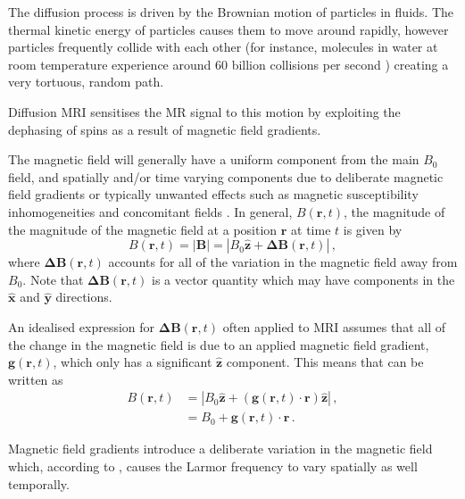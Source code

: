 The diffusion process is driven by the Brownian motion of particles in fluids.
The thermal kinetic energy of particles causes them to move around rapidly, however particles frequently collide with each other (for instance, molecules in water at room temperature experience around 60 billion collisions per second \cite{Denny1993}) creating a very tortuous, random path.

Diffusion \ac{MRI} sensitises the MR signal to this motion by exploiting the dephasing of spins as a result of magnetic field gradients.


The magnetic field will generally have a uniform component from the main $B_0$ field, and spatially and/or time varying components due to deliberate magnetic field gradients or typically unwanted effects such as magnetic susceptibility inhomogeneities and concomitant fields \cite{Haacke1999}. In general, $B(\mathbf{r}, t)$, the magnitude of the magnitude of the magnetic field at a position $\mathbf{r}$ at time $t$ is given by
\begin{equation}
  B(\mathbf{r}, t) = |\mathbf{B}| = |B_0\mathbf{\hat{z}} + \mathbf{\Delta B}(\mathbf{r}, t)|\,,
  \label{eq:mod_B}
\end{equation}
where $\mathbf{\Delta B}(\mathbf{r}, t)$ accounts for all of the variation in the magnetic field away from $B_0$. Note that $\mathbf{\Delta B}(\mathbf{r}, t)$ is a vector quantity which may have components in the $\mathbf{\hat{x}}$ and $\mathbf{\hat{y}}$ directions. 

An idealised expression for $\mathbf{\Delta B}(\mathbf{r}, t)$ often applied to \ac{MRI} assumes that all of the change in the magnetic field is due to an applied magnetic field gradient, $\mathbf{g}(\mathbf{r}, t)$, which only has a significant $\mathbf{\hat{z}}$ component. This means that  can be written as
\begin{align}
  B(\mathbf{r}, t) &= \left|B_0\mathbf{\hat{z}} + \left(\mathbf{g}(\mathbf{r}, t)\cdot\mathbf{r}\right) \mathbf{\hat{z}}\right|\,,\nonumber \\
                      &= B_0 + \mathbf{g}(\mathbf{r}, t)\cdot\mathbf{r}\,.
                        \label{eq:mod_B_ideal}
\end{align}

Magnetic field gradients introduce a deliberate variation in the magnetic field which, according to , causes the Larmor frequency to vary spatially as well temporally.

